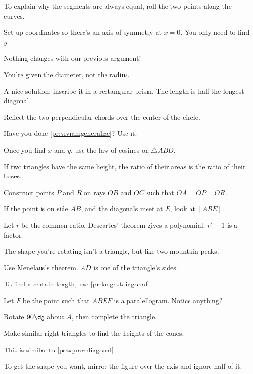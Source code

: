 \documentclass[11pt,paper=letter]{scrartcl}
\begin{document}
\begin{enumthin}[leftmargin=0pt]
\item \label{h:np23} To explain why the segments are always equal, roll the two points along the curves.
\item \label{h:pc52} Set up coordinates so there's an axis of symmetry at $x = 0$. You only need to find $y$.
\item \label{h:np03} Nothing changes with our previous argument!
\item \label{h:an31} You're given the diameter, not the radius.
\item \label{h:gbe3} A nice solution: inscribe it in a rectangular prism. The length is half the longest diagonal.
\item \label{h:os41} Reflect the two perpendicular chords over the center of the circle. 
\item \label{h:vt51} Have you done \autoref{pr:vivianigeneralize}? Use it.
\item \label{h:pt53} Once you find $x$ and $y$, use the law of cosines on $\triangle ABD$.
\item \label{h:cv01} If two triangles have the same height, the ratio of their areas is the ratio of their bases.
\item \label{h:gbf3} Construct points $P$ and $R$ on rays $OB$ and $OC$ such that $OA = OP = OR$. 
\item \label{h:gb72} If the point is on side $AB$, and the diagonals meet at $E$, look at $[ABE]$.
\item \label{h:dt23} Let $r$ be the common ratio. Descartes' theorem gives a polynomial. $r^2 + 1$ is a factor.
\item \label{h:pc51} The shape you're rotating isn't a triangle, but like two mountain peaks.
\item \label{h:rt04} Use Menelaus's theorem. $AD$ is one of the triangle's sides.
\item \label{h:eq31} To find a certain length, use \autoref{pr:longestdiagonal}.
\item \label{h:gba2} Let $F$ be the point such that $ABEF$ is a paralellogram. Notice anything?
\item \label{h:pt42} Rotate $90\dg$ about $A$, then complete the triangle.
\item \label{h:pc43} Make similar right triangles to find the heights of the cones.
\item \label{h:rd52} This is similar to \autoref{pr:squarediagonal}.
\item \label{h:pc50} To get the shape you want, mirror the figure over the axis and ignore half of it.

\end{enumthin}
\end{document}
